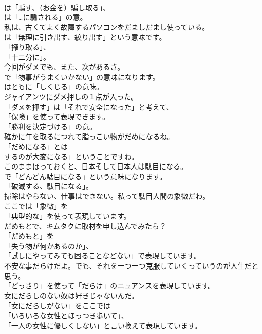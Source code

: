 \documentclass[8pt]{extreport}
\begin{document}
\begin{CJK}{UTF8}{min}
\\	は「騙す、（お金を）騙し取る」、
\\	は「…に騙される」の意。	
\\	私は、古くてよく故障するパソコンをだましだまし使っている。 
\\	は「無理に引き出す、絞り出す」という意味です。
\\	「搾り取る」、
\\	「十二分に」。	
\\	今回がダメでも、また、次があるさ。 
\\	で「物事がうまくいかない」の意味になります。
\\	はともに「しくじる」の意味。	
\\	ジャイアンツにダメ押しの１点が入った。 
\\	「ダメを押す」は「それで安全になった」と考えて、
\\	「保険」を使って表現できます。
\\	「勝利を決定づける」の意。	
\\	確かに年を取るにつれて脂っこい物がだめになるね。 
\\	「だめになる」とは
\\	するのが大変になる」ということですね。	
\\	このままほっておくと、日本そして日本人は駄目になる。 
\\	で「どんどん駄目になる」という意味になります。
\\	「破滅する、駄目になる」。	
\\	掃除はやらない、仕事はできない。私って駄目人間の象徴だわ。 
\\	ここでは「象徴」を
\\	「典型的な」を使って表現しています。	
\\	だめもとで、キムタクに取材を申し込んでみたら？ 
\\	「だめもと」を
\\	「失う物が何かあるのか」、
\\	「試しにやってみても困ることなどない」で表現しています。	
\\	不安な事だらけだよ。でも、それを一つ一つ克服していくっていうのが人生だと思う。 
\\	「どっさり」を使って「だらけ」のニュアンスを表現しています。	
\\	女にだらしのない奴は好きじゃないんだ。 
\\	「女にだらしがない」をここでは
\\	「いろいろな女性とほっつき歩いて」、
\\	「一人の女性に優しくしない」と言い換えて表現しています。	

\end{CJK}
\end{document}
